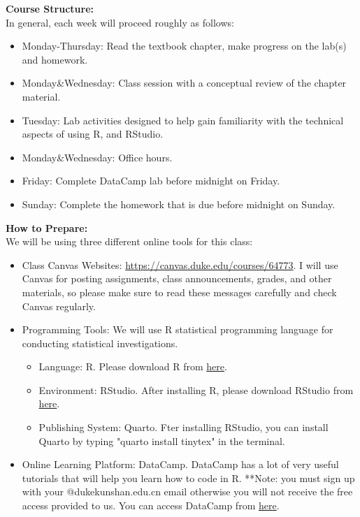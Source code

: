 \documentclass[11pt]{article}
\begin{document}
\vspace{0.5cm}
\large \textbf{Course Structure:}\\[0.5em]
In general, each week will proceed roughly as follows:
\begin{itemize}
    \item Monday-Thursday: Read the textbook chapter, make progress on the lab(s) and homework.
    \item Monday\&Wednesday: Class session with a conceptual review of the chapter material.
    \item Tuesday: Lab activities designed to help gain familiarity with the technical aspects of using R, and RStudio.
    \item Monday\&Wednesday: Office hours.
    \item Friday: Complete DataCamp lab before midnight on Friday.
    \item Sunday: Complete the homework that is due before midnight on Sunday.
\end{itemize}





\vspace{0.5cm}
\large \textbf{How to Prepare:}\\[0.5em]
We will be using three different online tools for this class:
\begin{itemize}
    \item Class Canvas Websites: \href{https://canvas.duke.edu/courses/64773}{https://canvas.duke.edu/courses/64773}. I will use Canvas for posting assignments, class announcements, grades, and other materials, so please make sure to read these messages carefully and check Canvas regularly.
    \item Programming Tools: We will use R statistical programming language for conducting statistical investigations. 
    \begin{itemize}
        \item Language: R. Please download R from \href{https://cran.r-project.org/}{here}.
        \item Environment: RStudio. After installing R, please download RStudio from \href{https://posit.co/download/rstudio-desktop/}{here}.
        \item Publishing System: Quarto. Fter installing RStudio, you can install Quarto by typing "quarto install tinytex" in the terminal.
    \end{itemize}
    \item Online Learning Platform: DataCamp. DataCamp has a lot of very useful tutorials that will help you learn how to code in R. **Note: you must sign up with your @dukekunshan.edu.cn email otherwise you will not receive the free access provided to us. You can access DataCamp from \href{https://www.datacamp.com/}{here}. 
\end{itemize}
\end{document}
